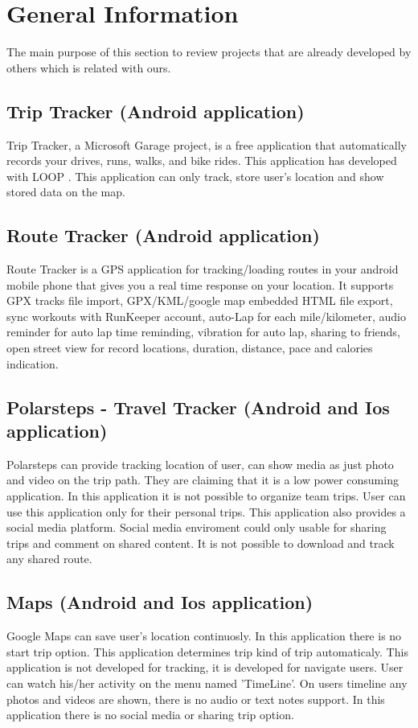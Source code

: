 \chapter{General Information}
The main purpose of this section to review projects that are already developed by others which is related with ours.
\section{Trip Tracker (Android application)}
Trip Tracker\cite{triptracker}, a Microsoft Garage project, is a free application that automatically records your drives, runs, walks, and bike rides. This application has developed with LOOP \cite{loop}. This application can only track, store user's location and show stored data on the map.

\section{Route Tracker (Android application)}
Route Tracker \cite{routetracker} is a GPS application for tracking/loading routes in your android mobile phone that gives you a real time response on your location. It supports GPX tracks file import, GPX/KML/google map embedded HTML file export, sync workouts with RunKeeper account, auto-Lap for each mile/kilometer, audio reminder for auto lap time reminding, vibration for auto lap, sharing to friends, open street view for record locations, duration, distance, pace and calories indication.

\section{Polarsteps - Travel Tracker (Android and Ios application)}
Polarsteps \cite{polarsteps} can provide tracking location of user, can show media as just photo and video on the trip path. They are claiming that it is a low power consuming application. In this application it is not possible to organize team trips. User can use this application only for their personal trips. This application also provides a social media platform. Social media enviroment could only usable for sharing trips and comment on shared content. It is not possible to download and track any shared route.

\section{Maps (Android and Ios application)}
Google Maps \cite{googlemap} can save user's location continuosly. In this application there is no start trip option. This application determines trip kind of trip automaticaly. This application is not developed for tracking, it is developed for navigate users. User can watch his/her activity on the menu named 'TimeLine'. On users timeline any photos and videos are shown, there is no audio or text notes support. In this application there is no social media or sharing trip option.

